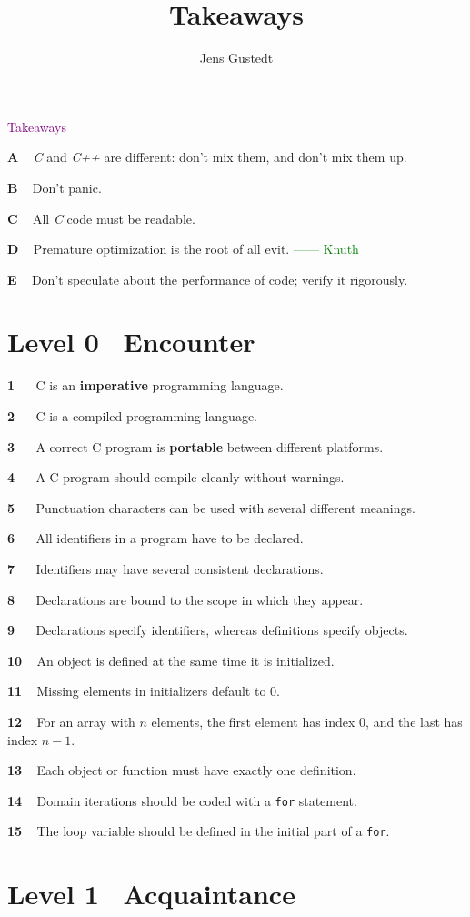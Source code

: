 \documentclass[UTF8,11pt,a4paper]{ctexart}
\title{Takeaways}
\author{Jens Gustedt}
\newcommand{\ta}[1]{ \noindent\textbf{#1} \ }
\newcommand{\red}[1]{\textcolor{red}{#1}}
\newcommand{\green}[1]{\textcolor{green}{#1}}
\newcommand{\purple}[1]{\textcolor{purple}{#1}}
\newcommand{\ok}{\red{\ding{52}}}
\begin{document}
\begin{center}	\LARGE\purple{Takeaways} \end{center}

\ta{A} \textit{C} and \textit{C++} are different: don't mix them, and don't mix them up. \ok

\ta{B} Don't panic. \ok

\ta{C} All \textit{C} code must be readable.

\ta{D} Premature optimization is the root of all evit. \green{—— Knuth}

\ta{E} Don't speculate about the performance of code; verify it rigorously.

\section*{Level 0 \ Encounter}

\ta{1} \ C is an \textbf{imperative} programming language.

\ta{2} \ C is a compiled programming language.

\ta{3} \ A correct C program is \textbf{portable} between different platforms.

\ta{4} \ A C program should compile cleanly without warnings.

\ta{5} \ Punctuation characters can be used with several different meanings.

\ta{6} \ All identifiers in a program have to be declared.

\ta{7} \ Identifiers may have several consistent declarations.

\ta{8} \ Declarations are bound to the scope in which they appear.

\ta{9} \ Declarations specify identifiers, whereas definitions specify objects.

\ta{10} An object is defined at the same time it is initialized.

\ta{11} Missing elements in initializers default to 0.

\ta{12} For an array with $n$ elements, the first element has index 0, and the last has index $n-1$.

\ta{13} Each object or function must have exactly one definition.

\ta{14} Domain iterations should be coded with a \lstinline|for| statement.

\ta{15} The loop variable should be defined in the initial part of a \lstinline|for|.

\section*{Level 1 \ Acquaintance}
\end{document}
